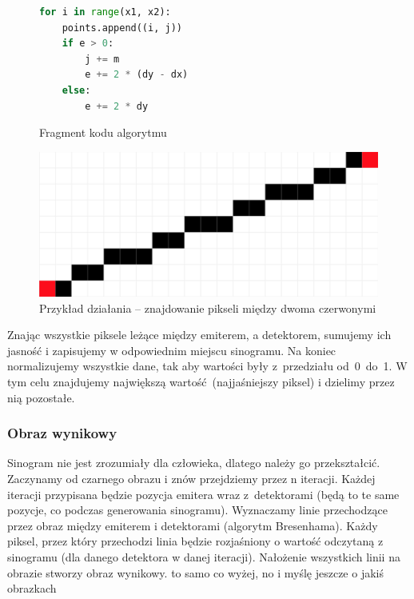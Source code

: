 \documentclass[polish,polish,a4paper]{article}
\begin{document}
				\begin{figure}[!h]
					\centering
					\begin{minipage}{0.4\linewidth}
						\begin{lstlisting}[language=Python, frame=single]
for i in range(x1, x2):
    points.append((i, j))
    if e > 0:
        j += m
        e += 2 * (dy - dx)
    else:
        e += 2 * dy
						\end{lstlisting}
						\caption{Fragment kodu algorytmu}
					\end{minipage}
					\hfill
					\begin{minipage}{0.45\linewidth}
						\includegraphics[width=\textwidth]{img/bresenham.png}
						\caption{Przykład działania -- znajdowanie pikseli między dwoma czerwonymi}
					\end{minipage}
				\end{figure}
				
				Znając wszystkie piksele leżące między emiterem, a detektorem, 
				sumujemy ich jasność i zapisujemy w odpowiednim miejscu sinogramu.
				Na koniec normalizujemy wszystkie dane, tak aby wartości były z~przedziału od~0~do~1. W tym celu znajdujemy największą wartość (najjaśniejszy piksel) i dzielimy przez nią pozostałe.
				
				\subsubsection{Obraz wynikowy}
				Sinogram nie jest zrozumiały dla człowieka, 
				dlatego należy go przekształcić.
				Zaczynamy od czarnego obrazu i znów przejdziemy przez n iteracji.
				Każdej iteracji przypisana będzie pozycja emitera wraz z~detektorami 
				(będą to te same pozycje, co podczas generowania sinogramu).
				Wyznaczamy linie przechodzące przez obraz między emiterem i detektorami (algorytm Bresenhama).
				Każdy piksel, przez który przechodzi linia będzie rozjaśniony o wartość odczytaną z sinogramu 
				(dla danego detektora w danej iteracji). 
				Nałożenie wszystkich linii na obrazie stworzy obraz wynikowy.
				{\color{red} to samo co wyżej, no i myślę jeszcze o jakiś obrazkach}
\end{document}
